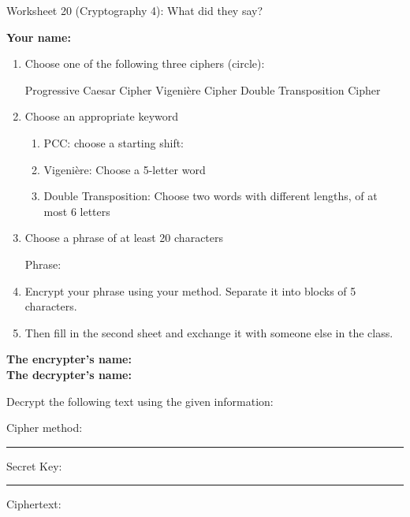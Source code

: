\documentclass[12pt]{article}
\newcommand{\ans}[1][1in]{\rule{#1}{.5pt}}
\newcommand{\be}{\begin{enumerate}}
\newcommand{\ee}{\end{enumerate}}
\begin{document}
\begin{center}
{\Large  Worksheet 20 (Cryptography 4): What did they say?}
\end{center}



\noindent \textbf{Your name:} \hrulefill \\

\begin{center}
\end{center}

\begin{enumerate}

\item 
Choose one of the following three ciphers (circle): 

Progressive Caesar Cipher \hfill Vigeni\`ere Cipher \hfill Double Transposition Cipher

\item Choose an appropriate keyword 
\be
\item PCC: choose a starting shift: \hrulefill
\item Vigeni\`ere: Choose a 5-letter word \hrulefill
\item Double Transposition: Choose two words with different lengths, of at most 6 letters

\hrulefill
\ee

\item Choose a phrase of at least 20 characters

Phrase: \hrulefill

\item Encrypt your phrase using your method. Separate it into blocks of 5 characters.
\vfill

\item Then fill in the second sheet and exchange it with someone else in the class.
\ee

\newpage

\noindent \textbf{The encrypter's name:} \hrulefill \\

\noindent \textbf{The decrypter's name:} \hrulefill \\

\begin{center}
\end{center}

Decrypt the following text using the given information:
\doublespacing



Cipher method: \ans[3in]

\bigskip

Secret Key: \ans[3in]

\bigskip

Ciphertext: \hrulefill

\hrulefill

\hrulefill

\vfill

\vfill
\end{document}
